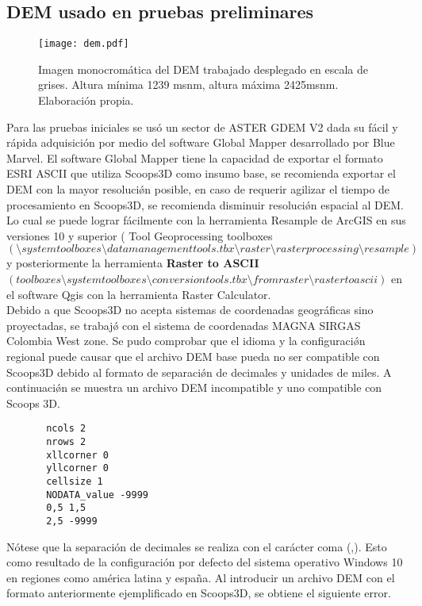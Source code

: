 \subsection{DEM usado en pruebas preliminares}

\begin{figure}[H]
\centering
\texttt{[image: dem.pdf]}
\caption{Imagen monocrom\'atica del DEM trabajado desplegado en escala de grises. Altura m\'inima 1239 msnm, altura m\'axima 2425msnm. Elaboraci\'on propia.}
\label{fig:dem usado}
\end{figure}


Para las pruebas iniciales se us\'o un sector de ASTER
GDEM V2 dada su f\'acil y r\'{a}pida adquisici\'on por medio del software Global Mapper
desarrollado por Blue Marvel.
El software Global Mapper tiene la capacidad de exportar el formato ESRI ASCII que utiliza
Scoops3D como insumo base, se recomienda exportar el DEM con la mayor resoluci\'{\o}n
posible, en caso de requerir agilizar el tiempo de procesamiento en Scoops3D, se
recomienda disminuir resoluci\'{\o}n espacial al DEM. Lo cual se puede lograr f\'{a}cilmente con la
herramienta Resample de ArcGIS en sus versiones 10 y superior (
Tool Geoprocessing
toolboxes $ (\setminus system toolboxes \setminus data management tools.tbx \setminus raster \setminus raster processing \setminus resample)$ y posteriormente la
herramienta \textbf{Raster to ASCII} $(toolboxes \setminus system toolboxes \setminus conversion tools.tbx \setminus from raster \setminus raster to ascii)$ en el software Qgis con la
herramienta Raster Calculator.\\
Debido a que Scoops3D no acepta sistemas de coordenadas geogr\'{a}ficas sino proyectadas,
se trabaj\'{\o} con el sistema de coordenadas MAGNA SIRGAS Colombia West zone. 
Se pudo comprobar que el idioma y la configuraci\'{\o}n regional puede causar que el archivo
DEM base pueda no ser compatible con Scoops3D debido al formato de separaci\'{\o}n de
decimales y unidades de miles. A continuaci\'{\o}n se muestra un archivo DEM incompatible y
uno compatible con Scoops 3D.

\begin{verbatim}
	   ncols 2
	   nrows 2
	   xllcorner 0
	   yllcorner 0
	   cellsize 1
	   NODATA_value -9999
	   0,5 1,5
	   2,5 -9999
\end{verbatim}

N\'{o}tese que la separaci\'{o}n de decimales se realiza con el car\'{a}cter coma (,). Esto como
resultado de la configuraci\'{o}n por defecto del sistema operativo Windows 10 en regiones
como am\'{e}rica latina y espa\~na.
Al introducir un archivo DEM con el formato anteriormente ejemplificado en Scoops3D, se
obtiene el siguiente error.


